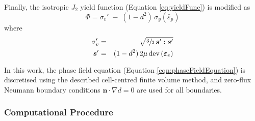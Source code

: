 \documentclass[sn-mathphys,Numbered,draft]{sn-jnl}%
\newcommand{\bb}{\boldsymbol}
\begin{document}
Finally, the isotropic $J_2$ yield function (Equation \ref{eq:yieldFunc}) is modified as \citep{borden_phase-field_2016}
\begin{equation}
	\Phi = \sigma_{v}' \; - \; (1 - d^2) \, \sigma_y\left(\bar{\varepsilon}_p \right)
\end{equation}
where 
\begin{eqnarray}
	\sigma_{v}' &=& \sqrt{\sfrac{3}{2} \, \bb{s}' : \bb{s}'} \\
	\boldsymbol{s}' &=& (1 - d^2)\, 2 \mu \, \text{dev}\left(\bb{\varepsilon}_{e}\right)
\end{eqnarray}

In this work, the phase field equation (Equation \ref{eqn:phaseFieldEquation}) is discretised using the described cell-centred finite volume method, and zero-flux Neumann boundary conditions $\bb{n} \cdot \nabla d=0$ are used for all boundaries.


\subsubsection{Computational Procedure}
\end{document}
